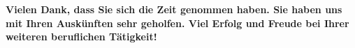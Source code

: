 \documentclass[a4paper,10pt]{article}
\makeatletter
\def\saveenum{\xdef\@savedenum{\the\c@enumi\relax}}
\makeatother
\begin{document}
{\begin{enumerate}
\end{enumerate} \saveenum

\vspace{-1cm}




\bigskip

\begin{flushleft}
\textbf{Vielen Dank, dass Sie sich die Zeit genommen haben. Sie haben uns mit Ihren Auskünften sehr geholfen. Viel Erfolg und Freude bei Ihrer weiteren beruflichen Tätigkeit!}
\end{flushleft}


}
\end{document}
